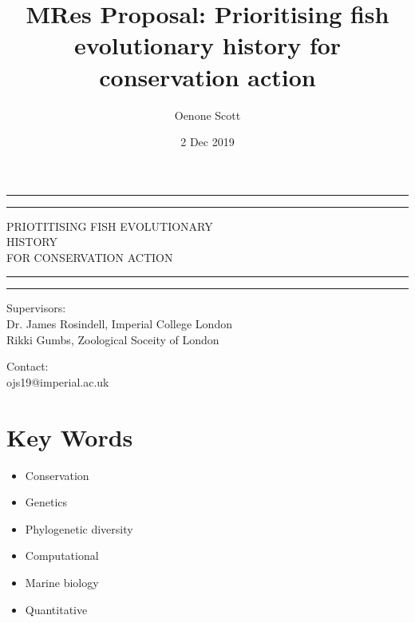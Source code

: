 \documentclass[11pt]{article}
\title {MRes Proposal: Prioritising fish evolutionary history for conservation action}
\author{Oenone Scott}
\date{2 Dec 2019}
\begin{document}
\begin{titlepage}


	\centering %
		
	
	
	
	\vspace*{5\baselineskip}
	
	\rule{\textwidth}{1.6pt}\vspace*{-\baselineskip}\vspace*{2pt} %
	\rule{\textwidth}{0.4pt} %
	
	\vspace{0.75\baselineskip} %
	
	{\LARGE PRIOTITISING FISH EVOLUTIONARY \\ HISTORY  \\ FOR CONSERVATION ACTION\\} 
	
	\vspace{0.75\baselineskip} %
	
	\rule{\textwidth}{0.4pt}\vspace*{-\baselineskip}\vspace{3.2pt} 
	\rule{\textwidth}{1.6pt} 
	
	\vspace{2\baselineskip} 
	
	
	Supervisors: \\
		Dr. James Rosindell, Imperial College London \\
		Rikki Gumbs, Zoological Soceity of London	

		
	\vspace{1.5 \baselineskip} %
	
	Contact: \\
	ojs19@imperial.ac.uk
	


\end{titlepage}

\linenumbers

	\section{Key Words}
	\begin{itemize}
	
	\item Conservation
	\item Genetics
	\item Phylogenetic diversity
	\item Computational
	\item Marine biology
	\item Quantitative
	\end{itemize}
	
\end{document}

